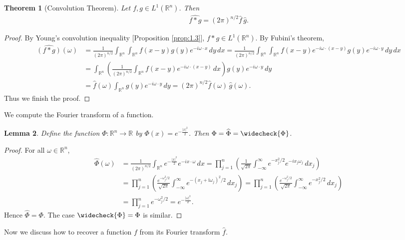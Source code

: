 \documentclass{article}
\numberwithin{equation}{section}
\newcommand{\bbR}{\mathbb{R}}
\newcommand{\wh}{\widehat}
\renewcommand{\i}{\mathrm{i}}
\theoremstyle{plain}
\newtheorem{theorem}{Theorem}[section]
\newtheorem{lemma}[theorem]{Lemma}
\theoremstyle{definition}
\begin{document}
\begin{theorem}[Convolution Theorem]\label{convthm2}
Let $f,g\in L^1(\bbR^n)$. Then
\begin{align*}
	\wh{f*g}=(2\pi)^{n/2}\wh{f}\,\wh{g}.
\end{align*}
\end{theorem}
\begin{proof}
By Young's convolution inequality [Proposition \ref{prop:1.3}], $f*g\in L^1(\bbR^n)$. By Fubini's theorem,
\begin{align*}
	\wh{(f*g)}(\omega)
	&=\frac{1}{(2\pi)^{n/2}}\int_{\bbR^n}\int_{\bbR^n}f(x-y)g(y)e^{-i\omega\cdot x}\,dy\,dx=\frac{1}{(2\pi)^{n/2}}\int_{\bbR^n}\int_{\bbR^n}f(x-y)e^{-i\omega\cdot(x-y)}g(y)e^{-i\omega\cdot y}\,dy\,dx\\
	&=\int_{\bbR^n}\left(\frac{1}{(2\pi)^{n/2}}\int_{\bbR^n}f(x-y)e^{-i\omega\cdot(x-y)}\,dx\right)g(y)e^{-i\omega\cdot y}\,dy\\
	&=\wh{f}(\omega)\int_{\bbR^n}g(y)e^{-i\omega\cdot y}\,dy=(2\pi)^{n/2}\wh{f}(\omega)\,\wh{g}(\omega).
\end{align*}
Thus we finish the proof.
\end{proof}

We compute the Fourier transform of a function.
\begin{lemma}\label{finvfeq}
Define the function $\Phi:\bbR^n\to\bbR$ by $\displaystyle\Phi(x)=e^{-\frac{\vert x\vert^2}{2}}$.
Then $\Phi=\wh{\Phi}=\widecheck{\Phi}$.
\end{lemma}
\begin{proof} For all $\omega\in\bbR^n$,
\begin{align*}
	\wh{\Phi}(\omega)&=\frac{1}{(2\pi)^{n/2}}\int_{\bbR^n}e^{-\frac{\vert x\vert^2}{2}}e^{-i x\cdot\omega}\,dx=\prod_{j=1}^n\left(\frac{1}{\sqrt{2\pi}}\int_{-\infty}^\infty e^{-x_j^2/2}e^{-i x_j\omega_j}\,dx_j\right)\\
	&=\prod_{j=1}^n\left(\frac{e^{-\omega_j^2/2}}{\sqrt{2\pi}}\int_{-\infty}^\infty e^{-(x_j+\i\omega_j)^2/2}\,dx_j\right)=\prod_{j=1}^n\left(\frac{e^{-\omega_j^2/2}}{\sqrt{2\pi}}\int_{-\infty}^\infty e^{-x_j^2/2}\,dx_j\right)\\
	&=\prod_{j=1}^ne^{-\omega_j^2/2}=e^{-\frac{\vert\omega\vert^2}{2}}.
\end{align*}
Hence $\wh{\Phi}=\Phi$. The case $\widecheck{\Phi}=\Phi$ is similar.
\end{proof}

Now we discuss how to recover a function $f$ from its Fourier transform $\wh{f}$.
\end{document}
